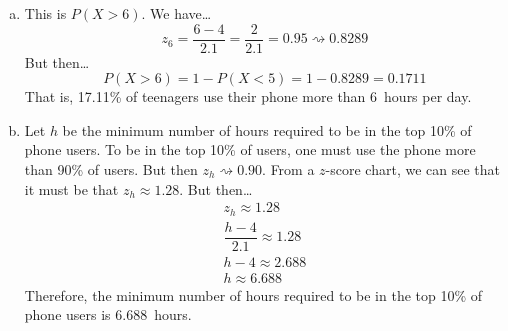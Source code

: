 \documentclass[11pt,letterpaper]{article}
\newcommand{\squiggle}{\rightsquigarrow}
\begin{document}
\begin{enumerate}[(a)]
\item This is $P(X > 6)$. We have\dots
	\[
	z_6= \dfrac{6 - 4}{2.1}= \dfrac{2}{2.1}= 0.95 \squiggle 0.8289
	\]
But then\dots
	\[
	P(X > 6)= 1 - P(X < 5)= 1 - 0.8289= 0.1711
	\] 
That is, 17.11\% of teenagers use their phone more than 6~hours per day. \pspace

\item Let $h$ be the minimum number of hours required to be in the top 10\% of phone users. To be in the top 10\% of users, one must use the phone more than 90\% of users. But then $z_h \squiggle 0.90$. From a $z$-score chart, we can see that it must be that $z_h \approx 1.28$. But then\dots
	\[
	\begin{gathered}
	z_h \approx 1.28 \\[0.3cm]
	\dfrac{h - 4}{2.1} \approx 1.28 \\[0.3cm]
	h - 4 \approx 2.688 \\[0.3cm]
	h \approx 6.688
	\end{gathered}
	\]
Therefore, the minimum number of hours required to be in the top 10\% of phone users is 6.688~hours. 
\end{enumerate}
\end{document}
